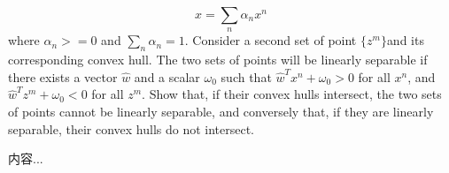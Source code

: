 \documentclass[a4paper]{article}
\begin{document}
\begin{enumerate}
\begin{equation*}
			x = \sum_n \alpha_n x^n
		\end{equation*}
		where $\alpha_n >=0$ and $\sum_n \alpha_n = 1$. Consider a second set of point $\{z^m\}$and its corresponding convex hull. The two sets of points will be linearly separable if there exists a vector $\hat{w}$ and a scalar $\omega_0$ such that $\hat{w}^Tx^n+\omega_0 >0$ for all $x^n$, and $\hat{w}^Tz^m + \omega_0<0$ for all $z^m$. Show that, if their convex hulls intersect, the two sets of points cannot be linearly separable, and conversely that, if they are linearly separable, their convex hulls do not intersect.
		\begin{solution}
			内容...
		\end{solution}
	\end{enumerate}
\end{document}
